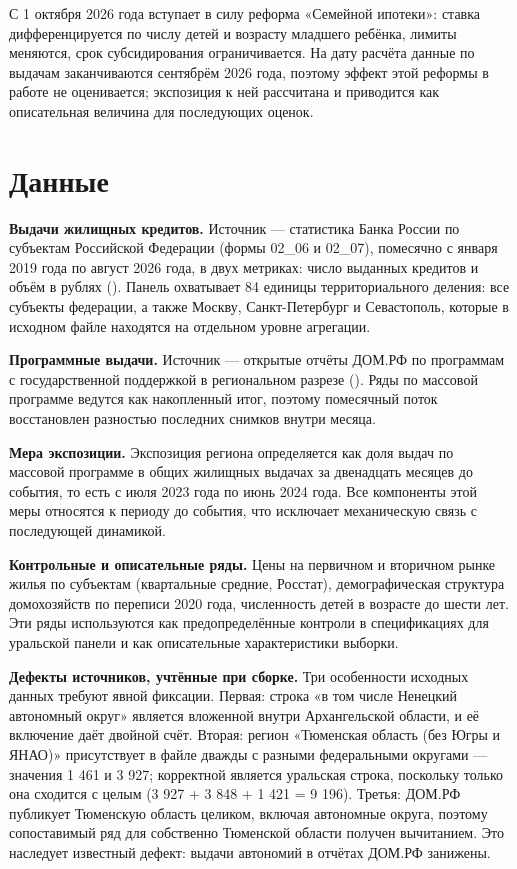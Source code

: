 \documentclass[
  russian,
  11pt,
]{article}
\begin{document}
С 1 октября 2026 года вступает в силу реформа «Семейной ипотеки»: ставка
дифференцируется по числу детей и возрасту младшего ребёнка, лимиты
меняются, срок субсидирования ограничивается. На дату расчёта данные по
выдачам заканчиваются сентябрём 2026 года, поэтому эффект этой реформы в
работе не оценивается; экспозиция к ней рассчитана и приводится как
описательная величина для последующих оценок.

\section{Данные}\label{ux434ux430ux43dux43dux44bux435}

\textbf{Выдачи жилищных кредитов.} Источник --- статистика Банка России
по субъектам Российской Федерации (формы 02\_06 и 02\_07), помесячно с
января 2019 года по август 2026 года, в двух метриках: число выданных
кредитов и объём в рублях ().
Панель охватывает 84 единицы территориального деления: все субъекты
федерации, а также Москву, Санкт-Петербург и Севастополь, которые в
исходном файле находятся на отдельном уровне агрегации.

\textbf{Программные выдачи.} Источник --- открытые отчёты ДОМ.РФ по
программам с государственной поддержкой в региональном разрезе
(). Ряды по массовой программе
ведутся как накопленный итог, поэтому помесячный поток восстановлен
разностью последних снимков внутри месяца.

\textbf{Мера экспозиции.} Экспозиция региона определяется как доля выдач
по массовой программе в общих жилищных выдачах за двенадцать месяцев до
события, то есть с июля 2023 года по июнь 2024 года. Все компоненты этой
меры относятся к периоду до события, что исключает механическую связь с
последующей динамикой.

\textbf{Контрольные и описательные ряды.} Цены на первичном и вторичном
рынке жилья по субъектам (квартальные средние, Росстат), демографическая
структура домохозяйств по переписи 2020 года, численность детей в
возрасте до шести лет. Эти ряды используются как предопределённые
контроли в спецификациях для уральской панели и как описательные
характеристики выборки.

\textbf{Дефекты источников, учтённые при сборке.} Три особенности
исходных данных требуют явной фиксации. Первая: строка «в том числе
Ненецкий автономный округ» является вложенной внутри Архангельской
области, и её включение даёт двойной счёт. Вторая: регион «Тюменская
область (без Югры и ЯНАО)» присутствует в файле дважды с разными
федеральными округами --- значения 1 461 и 3 927; корректной является
уральская строка, поскольку только она сходится с целым (3 927 + 3 848 +
1 421 = 9 196). Третья: ДОМ.РФ публикует Тюменскую область целиком,
включая автономные округа, поэтому сопоставимый ряд для собственно
Тюменской области получен вычитанием. Это наследует известный дефект:
выдачи автономий в отчётах ДОМ.РФ занижены.
\end{document}
